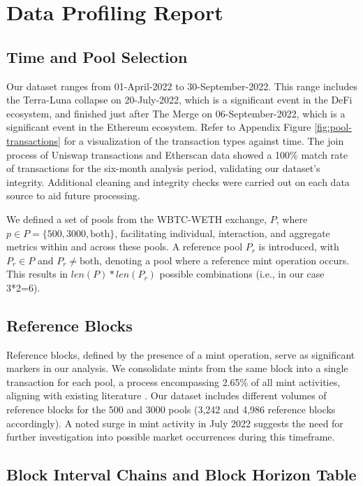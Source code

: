 \documentclass{article}
\begin{document}
\section{Data Profiling Report}

\subsection{Time and Pool Selection}

Our dataset ranges from 01-April-2022 to 30-September-2022. This range includes the Terra-Luna collapse on 20-July-2022, which is a significant event in the DeFi ecosystem, and finished just after The Merge on 06-September-2022, which is a significant event in the Ethereum ecosystem. Refer to Appendix Figure \ref{fig:pool-transactions} for a visualization of the transaction types against time. The join process of Uniswap transactions and Etherscan data showed a 100\% match rate of transactions for the six-month analysis period, validating our dataset's integrity. Additional cleaning and integrity checks were carried out on each data source to aid future processing.

We defined a set of pools from the WBTC-WETH exchange, \(P\), where \(p \in P=\{500,3000,\text{both}\}\), facilitating individual, interaction, and aggregate metrics within and across these pools. A reference pool \(P_r\) is introduced, with \(P_r \in P\) and \(P_r \neq \text{both}\), denoting a pool where a reference mint operation occurs. This results in \(len(P) * len(P_r)\) possible combinations (i.e., in our case 3*2=6).

\subsection{Reference Blocks}

Reference blocks, defined by the presence of a mint operation, serve as significant markers in our analysis. We consolidate mints from the same block into a single transaction for each pool, a process encompassing 2.65\% of all mint activities, aligning with existing literature \cite{Miori2023}. Our dataset includes different volumes of reference blocks for the 500 and 3000 pools (3,242 and 4,986 reference blocks accordingly). A noted surge in mint activity in July 2022 suggests the need for further investigation into possible market occurrences during this timeframe.

\subsection{Block Interval Chains and Block Horizon Table}
\end{document}
